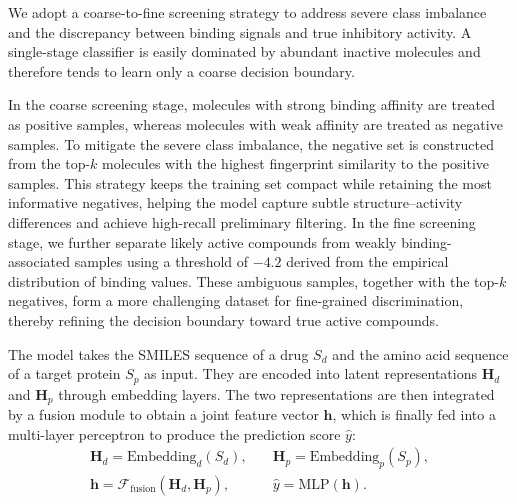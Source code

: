 \documentclass[unnumsec,webpdf,contemporary,large]{oup-authoring-template}%
\theoremstyle{thmstyleone}%
\theoremstyle{thmstyletwo}%
\theoremstyle{thmstylethree}%
\begin{document}


We adopt a coarse-to-fine screening strategy to address severe class imbalance and the discrepancy between binding signals and true inhibitory activity. A single-stage classifier is easily dominated by abundant inactive molecules and therefore tends to learn only a coarse decision boundary.

In the coarse screening stage, molecules with strong binding affinity are treated as positive samples, whereas molecules with weak affinity are treated as negative samples. To mitigate the severe class imbalance, the negative set is constructed from the top-$k$ molecules with the highest fingerprint similarity to the positive samples. This strategy keeps the training set compact while retaining the most informative negatives, helping the model capture subtle structure--activity differences and achieve high-recall preliminary filtering. In the fine screening stage, we further separate likely active compounds from weakly binding-associated samples using a threshold of $-4.2$ derived from the empirical distribution of binding values. These ambiguous samples, together with the top-$k$ negatives, form a more challenging dataset for fine-grained discrimination, thereby refining the decision boundary toward true active compounds.


The model takes the SMILES sequence of a drug $S_d$ and the amino acid sequence of a target protein $S_p$ as input. They are encoded into latent representations $\mathbf{H}_d$ and $\mathbf{H}_p$ through embedding layers. The two representations are then integrated by a fusion module to obtain a joint feature vector $\mathbf{h}$, which is finally fed into a multi-layer perceptron to produce the prediction score $\hat{y}$:
\begin{equation}
\begin{aligned}
\mathbf{H}_d = \mathrm{Embedding}_d(S_d),& \quad
\mathbf{H}_p = \mathrm{Embedding}_p(S_p), \\
\mathbf{h} = \mathcal{F}_{\mathrm{fusion}}(\mathbf{H}_d, \mathbf{H}_p),& \quad \hat{y} = \mathrm{MLP}(\mathbf{h}).
\end{aligned}
\end{equation}
\end{document}
